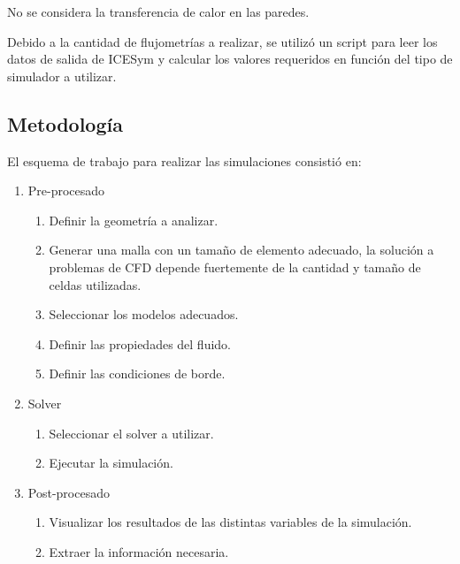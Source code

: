 No se considera la transferencia de calor en las paredes.

Debido a la cantidad de flujometrías a realizar, se utilizó un script para leer
los datos de salida de ICESym y calcular los valores requeridos en función del
tipo de simulador a utilizar.


\subsection{Metodología}
%
El esquema de trabajo para realizar las simulaciones consistió en:

\begin{enumerate}
    \item Pre-procesado
        \begin{enumerate}
            \item Definir la geometría a analizar.
            \item Generar una malla con un tamaño de elemento adecuado, la
                solución a problemas de CFD depende fuertemente de la cantidad
                y tamaño de celdas utilizadas.
            \item Seleccionar los modelos adecuados.
            \item Definir las propiedades del fluido.
            \item Definir las condiciones de borde.

        \end{enumerate}
    \item Solver
    \begin{enumerate} \item Seleccionar el solver a utilizar.
            \item Ejecutar la simulación.
    \end{enumerate}
\item Post-procesado
    \begin{enumerate}
        \item Visualizar los resultados de las distintas variables de la
            simulación.
        \item Extraer la información necesaria.
    \end{enumerate}
\end{enumerate}

